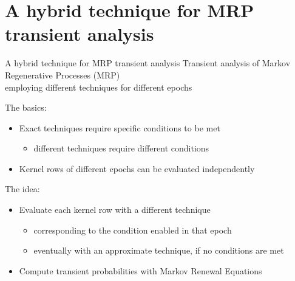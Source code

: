 
\section{A hybrid technique for MRP transient analysis}
  \begin{frame}{A hybrid technique for MRP transient analysis}
    Transient analysis of Markov Regenerative Processes (MRP)\\
    employing different techniques for different epochs
    
    \vspace{1em}
    The basics:
    \begin{itemize}
      \item Exact techniques require specific conditions to be met
      \begin{itemize}
        \item different techniques require different conditions
      \end{itemize}
      \item Kernel rows of different epochs can be evaluated independently
    \end{itemize}
    
    \vspace{1em}
    The idea:
    \begin{itemize}
      \item Evaluate each kernel row with a different technique
      \begin{itemize}
        \item corresponding to the condition enabled in that epoch
        \item eventually with an approximate technique, if no conditions are met
      \end{itemize}
      \item Compute transient probabilities with Markov Renewal Equations
    \end{itemize}
  \end{frame}
  
